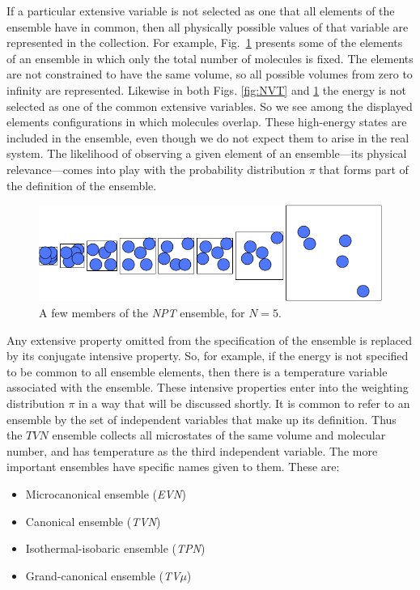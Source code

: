 \documentclass[]{article}
\begin{document}
If a particular extensive variable is not selected as one that all
elements of the ensemble have in common, then all physically possible
values of that variable are represented in the collection. For example,
Fig.~\ref{fig:NPT} presents some of the elements of an ensemble in which
only the total number of molecules is fixed. The elements are not
constrained to have the same volume, so all possible volumes from zero
to infinity are represented. Likewise in both Figs. \ref{fig:NVT} and \ref{fig:NPT} the
energy is not selected as one of the common extensive variables. So we
see among the displayed elements configurations in which molecules
overlap. These high-energy states are included in the ensemble, even
though we do not expect them to arise in the real system. The likelihood
of observing a given element of an ensemble---its physical
relevance---comes into play with the probability distribution $\pi$ that
forms part of the definition of the ensemble.
\begin{figure}
\includegraphics[width=\textwidth]{Statmech_figures/image111}
\caption{\label{fig:NPT}A few members of the \emph{NPT} ensemble, for $N = 5$.}
\end{figure}


Any extensive property omitted from the specification of the ensemble is
replaced by its conjugate intensive property. So, for example, if the
energy is not specified to be common to all ensemble elements, then
there is a temperature variable associated with the ensemble. These
intensive properties enter into the weighting distribution $\pi$ in a way
that will be discussed shortly. It is common to refer to an ensemble by
the set of independent variables that make up its definition. Thus the
$TVN$ ensemble collects all microstates of the same volume and molecular
number, and has temperature as the third independent variable. The more
important ensembles have specific names given to them. These are:

\begin{itemize}
\item
  Microcanonical ensemble (\emph{EVN})
\item
  Canonical ensemble (\emph{TVN})
\item
  Isothermal-isobaric ensemble (\emph{TPN})
\item
  Grand-canonical ensemble (\emph{TV$\mu$})
\end{itemize}
\end{document}
